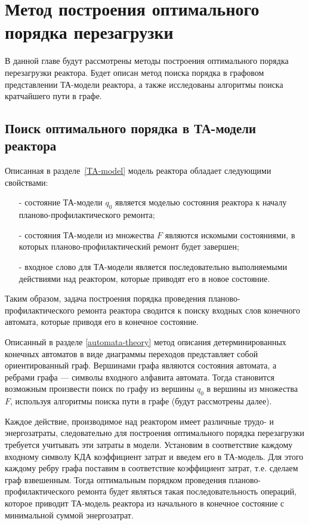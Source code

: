 \chapter{Метод построения оптимального порядка перезагрузки}\label{method}
В данной главе будут рассмотрены методы построения оптимального порядка перезагрузки реактора.
Будет описан метод поиска порядка в графовом представлении ТА-модели реактора, а также исследованы алгоритмы поиска кратчайшего пути в графе.

\section{Поиск оптимального порядка в ТА-модели реактора}
Описанная в разделе~\ref{TA-model} модель реактора обладает следующими свойствами:
\begin{itemize}
 \item [-] состояние ТА-модели $q_0$ является моделью состояния реактора к началу планово-профилактического ремонта;
 \item [-] состояния ТА-модели из множества $F$ являются искомыми состояниями, в которых планово-профилактический ремонт будет завершен;
 \item [-] входное слово для ТА-модели является последовательно выполняемыми действиями над реактором, которые приводят его в новое состояние.
\end{itemize}
Таким образом, задача построения порядка проведения планово-профилактического ремонта реактора сводится к поиску входных слов конечного автомата, которые приводя его в конечное состояние.

Описанный в разделе \ref{automata-theory} метод описания детерминированных конечных автоматов в виде диаграммы переходов представляет собой ориентированный граф.
Вершинами графа являются состояния автомата, а ребрами графа --- символы входного алфавита автомата. 
Тогда становится возможным произвести поиск по графу из вершины $q_0$ в вершины из множества $F$, используя алгоритмы поиска пути в графе (будут рассмотрены далее).

Каждое действие, производимое над реактором имеет различные трудо- и энергозатраты, следовательно для построения оптимального порядка перезагрузки требуется учитывать эти затраты в модели.
Установим в соответствие каждому входному символу КДА коэффициент затрат и введем его в ТА-модель.
Для этого каждому ребру графа поставим в соответствие коэффициент затрат, т.е. сделаем граф взвешенным.
Тогда оптимальным порядком проведения планово-профилактического ремонта будет являться такая последовательность операций, которое приводит ТА-модель реактора из начального в конечное состояние с минимальной суммой энергозатрат.

